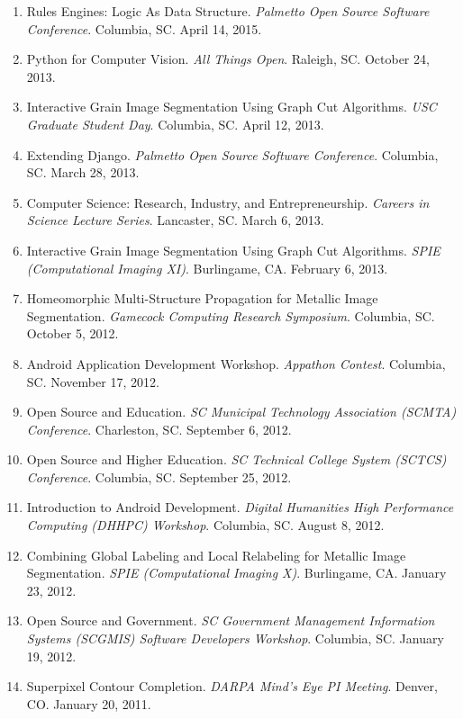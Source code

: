 \documentclass[10pt]{article}
\begin{document}
\begin{enumerate}
\renewcommand{\labelenumi}{[P\arabic{enumi}] }
\item Rules Engines: Logic As Data Structure. \emph{Palmetto Open Source Software Conference}. Columbia, SC. April 14, 2015.
\item Python for Computer Vision. \emph{All Things Open}. Raleigh, SC. October 24, 2013.
\item Interactive Grain Image Segmentation Using Graph Cut Algorithms. \emph{USC Graduate Student Day}. Columbia, SC. April 12, 2013.
\item Extending Django.  \emph{Palmetto Open Source Software
    Conference}.  Columbia, SC.  March 28, 2013.
\item Computer Science: Research, Industry, and Entrepreneurship.
  \emph{Careers in Science Lecture Series}.  Lancaster, SC.  March 6,
  2013.
\item Interactive Grain Image Segmentation Using Graph Cut Algorithms.
  \emph{SPIE (Computational Imaging XI)}.  Burlingame, CA.  February
  6, 2013.
\item Homeomorphic Multi-Structure Propagation for Metallic Image
  Segmentation.  \emph{Gamecock Computing Research Symposium}.
  Columbia, SC.  October 5, 2012.
\item Android Application Development Workshop.  \emph{Appathon
    Contest}.  Columbia, SC.  November 17, 2012.
\item Open Source and Education. \emph{SC Municipal Technology
    Association (SCMTA) Conference}. Charleston, SC.  September 6,
  2012.
\item Open Source and Higher Education.  \emph{SC Technical College
    System (SCTCS) Conference}.  Columbia, SC.  September 25, 2012.
\item Introduction to Android Development.  \emph{Digital Humanities
    High Performance Computing (DHHPC) Workshop}.  Columbia, SC.
  August 8, 2012.
\item Combining Global Labeling and Local Relabeling for Metallic
  Image Segmentation.  \emph{SPIE (Computational Imaging X)}.
  Burlingame, CA.  January 23, 2012.
\item Open Source and Government.  \emph{SC Government Management
    Information Systems (SCGMIS) Software Developers Workshop}.
  Columbia, SC.  January 19, 2012.
\item Superpixel Contour Completion.  \emph{DARPA Mind's Eye PI
    Meeting}.  Denver, CO.  January 20, 2011.
\end{enumerate}
\end{document}
